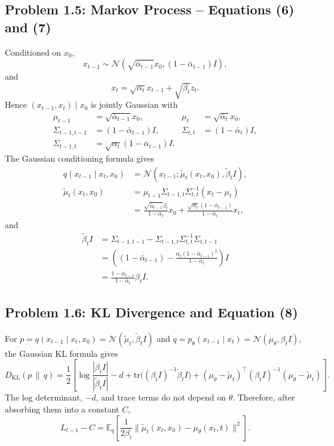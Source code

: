 \documentclass[11pt]{article}
\newcommand{\E}{\mathbb{E}}
\newcommand{\N}{\mathcal{N}}
\newcommand{\KL}{D_{\mathrm{KL}}}
\newcommand{\Id}{I}
\begin{document}
\subsection*{Problem 1.5: Markov Process -- Equations (6) and (7)}
Conditioned on $x_0$,
\[
x_{t-1}\sim \N(\sqrt{\bar\alpha_{t-1}}x_0,(1-\bar\alpha_{t-1})\Id),
\]
and
\[
x_t=\sqrt{\alpha_t}x_{t-1}+\sqrt{\beta_t}z_t.
\]
Hence $(x_{t-1},x_t)\mid x_0$ is jointly Gaussian with
\begin{align*}
\mu_{t-1}&=\sqrt{\bar\alpha_{t-1}}x_0,&
\mu_t&=\sqrt{\bar\alpha_t}x_0,\\
\Sigma_{t-1,t-1}&=(1-\bar\alpha_{t-1})\Id,&
\Sigma_{t,t}&=(1-\bar\alpha_t)\Id,\\
\Sigma_{t-1,t}&=\sqrt{\alpha_t}(1-\bar\alpha_{t-1})\Id.
\end{align*}
The Gaussian conditioning formula gives
\begin{align*}
q(x_{t-1}\mid x_t,x_0)
&=\N(x_{t-1};\tilde\mu_t(x_t,x_0),\tilde\beta_t\Id),\\
\tilde\mu_t(x_t,x_0)
&=\mu_{t-1}
\Sigma_{t-1,t}\Sigma_{t,t}^{-1}(x_t-\mu_t)\\
&=\frac{\sqrt{\bar\alpha_{t-1}}\beta_t}{1-\bar\alpha_t}x_0
+\frac{\sqrt{\alpha_t}(1-\bar\alpha_{t-1})}{1-\bar\alpha_t}x_t,
\end{align*}
and
\begin{align*}
\tilde\beta_t\Id
&=\Sigma_{t-1,t-1}-\Sigma_{t-1,t}\Sigma_{t,t}^{-1}\Sigma_{t,t-1}\\
&=\left((1-\bar\alpha_{t-1})
-\frac{\alpha_t(1-\bar\alpha_{t-1})^2}{1-\bar\alpha_t}\right)\Id\\
&=\frac{1-\bar\alpha_{t-1}}{1-\bar\alpha_t}\beta_t\Id.
\end{align*}

\subsection*{Problem 1.6: KL Divergence and Equation (8)}
For $p=q(x_{t-1}\mid x_t,x_0)=\N(\tilde\mu_t,\tilde\beta_t\Id)$ and
$q=p_\theta(x_{t-1}\mid x_t)=\N(\mu_\theta,\beta_t\Id)$, the Gaussian KL formula gives
\[
\KL(p\,\|\,q)
=\frac12\left[
\log\frac{|\beta_t\Id|}{|\tilde\beta_t\Id|}
-d+\mathrm{tr}\big((\beta_t\Id)^{-1}\tilde\beta_t\Id\big)
+(\mu_\theta-\tilde\mu_t)^\top(\beta_t\Id)^{-1}(\mu_\theta-\tilde\mu_t)
\right].
\]
The log determinant, $-d$, and trace terms do not depend on $\theta$.  Therefore, after absorbing them into a constant $C$,
\[
L_{t-1}-C
=\E_q\left[\frac{1}{2\beta_t}
\|\tilde\mu_t(x_t,x_0)-\mu_\theta(x_t,t)\|^2\right].
\]
\end{document}
